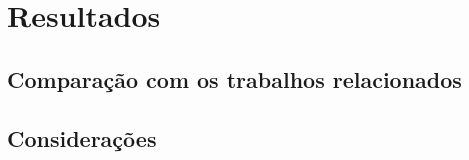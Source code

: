 \chapter{Resultados}
\label{c_resultados}

\section{Comparação com os trabalhos relacionados}
\label{sec:comparacao}

\section{Considerações}
\label{sec:}

